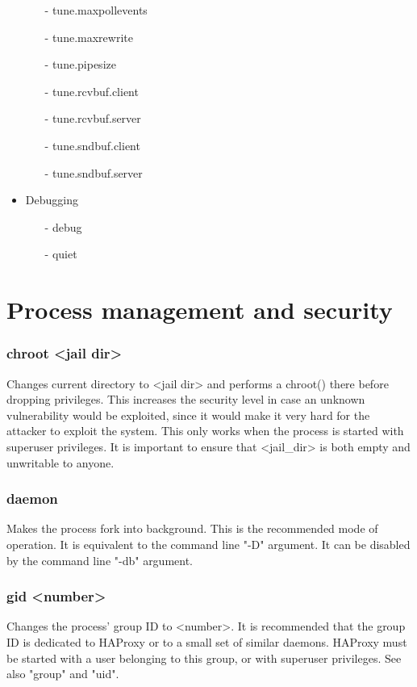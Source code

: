 \begin{itemize}
\begin{itemize}
    \item[-] tune.maxpollevents
    \item[-] tune.maxrewrite
    \item[-] tune.pipesize
    \item[-] tune.rcvbuf.client
    \item[-] tune.rcvbuf.server
    \item[-] tune.sndbuf.client
    \item[-] tune.sndbuf.server
  \end{itemize}
\item Debugging
  \begin{itemize}
    \item[-] debug
    \item[-] quiet
  \end{itemize}
\end{itemize}

\section{Process management and security}

\subsubsection[chroot]{chroot <jail dir>}
  Changes current directory to <jail dir> and performs a chroot() there before
  dropping privileges. This increases the security level in case an unknown
  vulnerability would be exploited, since it would make it very hard for the
  attacker to exploit the system. This only works when the process is started
  with superuser privileges. It is important to ensure that <jail\_dir> is both
  empty and unwritable to anyone.
  
\subsubsection[daemon]{daemon}
  Makes the process fork into background. This is the recommended mode of
  operation. It is equivalent to the command line "-D" argument. It can be
  disabled by the command line "-db" argument.
  
\subsubsection[gid]{gid <number>}
  Changes the process' group ID to <number>. It is recommended that the group
  ID is dedicated to HAProxy or to a small set of similar daemons. HAProxy must
  be started with a user belonging to this group, or with superuser privileges.
  See also "group" and "uid".
  
